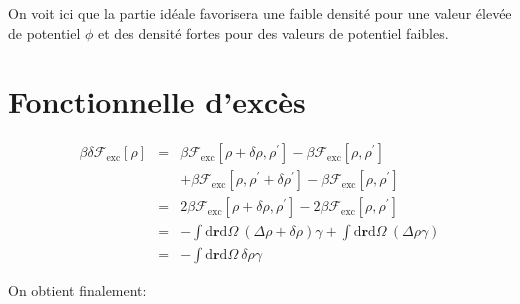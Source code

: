 On voit ici que la partie idéale favorisera une faible densité pour une valeur élevée de potentiel $\phi$ et des densité fortes pour des valeurs de potentiel faibles.

\section{Fonctionnelle d'excès}
\label{sec:annexes:grad:exc}



\begin{eqnarray}
\beta \delta \mathcal{F}_\mathrm{exc}[\rho] &=& \beta \mathcal{F}_\mathrm{exc}[\rho + \delta \rho, \rho^\prime] -\beta \mathcal{F}_\mathrm{exc}[\rho, \rho^\prime] \\
& & + \beta \mathcal{F}_\mathrm{exc}[\rho, \rho^\prime + \delta \rho^\prime] -\beta \mathcal{F}_\mathrm{exc}[\rho, \rho^\prime] \nonumber\\
&=& 2 \beta \mathcal{F}_\mathrm{exc}[\rho + \delta \rho, \rho^\prime] - 2 \beta \mathcal{F}_\mathrm{exc}[\rho, \rho^\prime] \\
&=& -\int\mathrm{d}\boldsymbol{r}\mathrm{d}\Omega\ (\Delta\rho+\delta\rho) \gamma  + \int\mathrm{d}\boldsymbol{r}\mathrm{d}\Omega\ (\Delta\rho \gamma) \\
&=& -\int\mathrm{d}\boldsymbol{r}\mathrm{d}\Omega\ \delta\rho \gamma
\end{eqnarray}

On obtient finalement:

